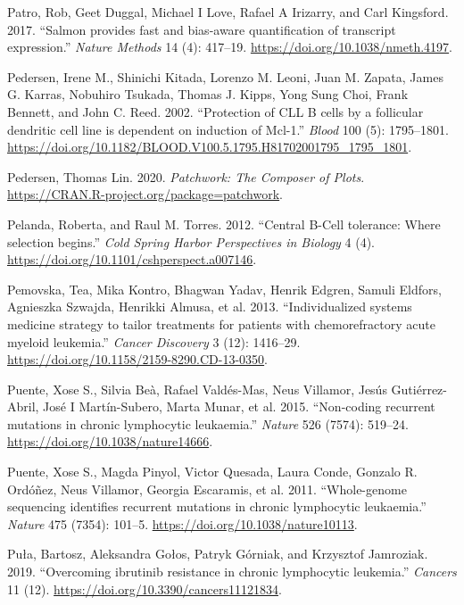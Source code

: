 \documentclass[11pt, a4paper, twosided]{book}
\newenvironment{CSLReferences}%
  {}%
  {\par}
\begin{document}
\begin{CSLReferences}{1}{0}
\leavevmode{}%
Patro, Rob, Geet Duggal, Michael I Love, Rafael A Irizarry, and Carl Kingsford. 2017. {``{Salmon provides fast and bias-aware quantification of transcript expression}.''} \emph{Nature Methods} 14 (4): 417--19. \url{https://doi.org/10.1038/nmeth.4197}.

\leavevmode{}%
Pedersen, Irene M., Shinichi Kitada, Lorenzo M. Leoni, Juan M. Zapata, James G. Karras, Nobuhiro Tsukada, Thomas J. Kipps, Yong Sung Choi, Frank Bennett, and John C. Reed. 2002. {``{Protection of CLL B cells by a follicular dendritic cell line is dependent on induction of Mcl-1}.''} \emph{Blood} 100 (5): 1795--1801. \url{https://doi.org/10.1182/BLOOD.V100.5.1795.H81702001795_1795_1801}.

\leavevmode{}%
Pedersen, Thomas Lin. 2020. \emph{Patchwork: The Composer of Plots}. \url{https://CRAN.R-project.org/package=patchwork}.

\leavevmode{}%
Pelanda, Roberta, and Raul M. Torres. 2012. {``{Central B-Cell tolerance: Where selection begins}.''} \emph{Cold Spring Harbor Perspectives in Biology} 4 (4). \url{https://doi.org/10.1101/cshperspect.a007146}.

\leavevmode{}%
Pemovska, Tea, Mika Kontro, Bhagwan Yadav, Henrik Edgren, Samuli Eldfors, Agnieszka Szwajda, Henrikki Almusa, et al. 2013. {``{Individualized systems medicine strategy to tailor treatments for patients with chemorefractory acute myeloid leukemia}.''} \emph{Cancer Discovery} 3 (12): 1416--29. \url{https://doi.org/10.1158/2159-8290.CD-13-0350}.

\leavevmode{}%
Puente, Xose S., Silvia Beà, Rafael Valdés-Mas, Neus Villamor, Jesús Gutiérrez-Abril, José I Martín-Subero, Marta Munar, et al. 2015. {``{Non-coding recurrent mutations in chronic lymphocytic leukaemia}.''} \emph{Nature} 526 (7574): 519--24. \url{https://doi.org/10.1038/nature14666}.

\leavevmode{}%
Puente, Xose S., Magda Pinyol, Victor Quesada, Laura Conde, Gonzalo R. Ordóñez, Neus Villamor, Georgia Escaramis, et al. 2011. {``{Whole-genome sequencing identifies recurrent mutations in chronic lymphocytic leukaemia}.''} \emph{Nature} 475 (7354): 101--5. \url{https://doi.org/10.1038/nature10113}.

\leavevmode{}%
Puła, Bartosz, Aleksandra Gołos, Patryk Górniak, and Krzysztof Jamroziak. 2019. {``{Overcoming ibrutinib resistance in chronic lymphocytic leukemia}.''} \emph{Cancers} 11 (12). \url{https://doi.org/10.3390/cancers11121834}.


\end{CSLReferences}
\end{document}
